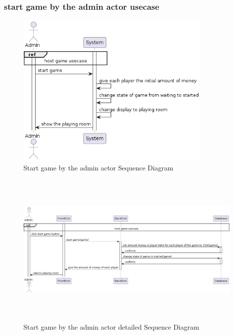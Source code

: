 \documentclass{article}
\begin{document}
\subsubsection{start game by the admin actor usecase}
\begin{figure}[H]
	\centering
	\includegraphics[height=3in]{../thesis_tex/assets/diagrams/admin_start_game_SD.png}
	\caption{Start game by the admin actor Sequence Diagram}
\end{figure}

\begin{figure}[H]
	\centering
	\includegraphics[height=3in]{../thesis_tex/assets/diagrams/admin_start_game_detailedSD.png}
	\caption{Start game by the admin actor detailed Sequence Diagram}
\end{figure}
\end{document}

